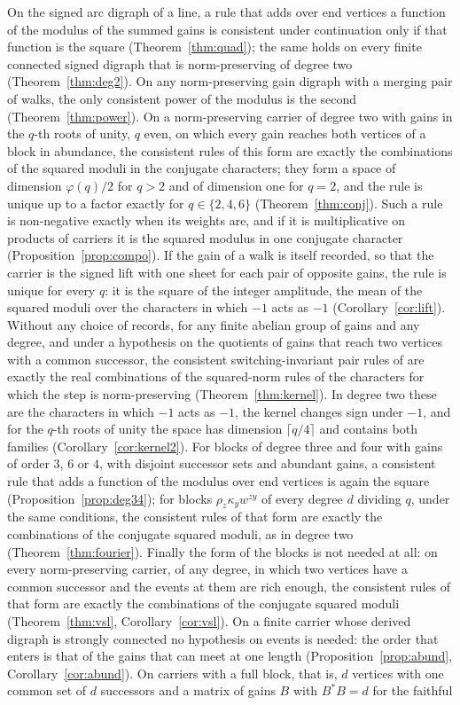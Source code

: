 \item On the signed arc digraph of a line, a rule that adds over end vertices a function of the modulus of the summed gains is consistent under continuation only if that function is the square (Theorem~\ref{thm:quad}); the same holds on every finite connected signed digraph that is norm-preserving of degree two (Theorem~\ref{thm:deg2}). On any norm-preserving gain digraph with a merging pair of walks, the only consistent power of the modulus is the second (Theorem~\ref{thm:power}). On a norm-preserving carrier of degree two with gains in the $q$-th roots of unity, $q$ even, on which every gain reaches both vertices of a block in abundance, the consistent rules of this form are exactly the combinations of the squared moduli in the conjugate characters; they form a space of dimension $\varphi(q)/2$ for $q>2$ and of dimension one for $q=2$, and the rule is unique up to a factor exactly for $q\in\{2,4,6\}$ (Theorem~\ref{thm:conj}). Such a rule is non-negative exactly when its weights are, and if it is multiplicative on products of carriers it is the squared modulus in one conjugate character (Proposition~\ref{prop:compo}). If the gain of a walk is itself recorded, so that the carrier is the signed lift with one sheet for each pair of opposite gains, the rule is unique for every $q$: it is the square of the integer amplitude, the mean of the squared moduli over the characters in which $-1$ acts as $-1$ (Corollary~\ref{cor:lift}). Without any choice of records, for any finite abelian group of gains and any degree, and under a hypothesis on the quotients of gains that reach two vertices with a common successor, the consistent switching-invariant pair rules of \cite{g8} are exactly the real combinations of the squared-norm rules of the characters for which the step is norm-preserving (Theorem~\ref{thm:kernel}). In degree two these are the characters in which $-1$ acts as $-1$, the kernel changes sign under $-1$, and for the $q$-th roots of unity the space has dimension $\lceil q/4\rceil$ and contains both families (Corollary~\ref{cor:kernel2}). For blocks of degree three and four with gains of order $3$, $6$ or $4$, with disjoint successor sets and abundant gains, a consistent rule that adds a function of the modulus over end vertices is again the square (Proposition~\ref{prop:deg34}); for blocks $\rho_z\kappa_yw^{zy}$ of every degree $d$ dividing $q$, under the same conditions, the consistent rules of that form are exactly the combinations of the conjugate squared moduli, as in degree two (Theorem~\ref{thm:fourier}). Finally the form of the blocks is not needed at all: on every norm-preserving carrier, of any degree, in which two vertices have a common successor and the events at them are rich enough, the consistent rules of that form are exactly the combinations of the conjugate squared moduli (Theorem~\ref{thm:vsl}, Corollary~\ref{cor:vsl}). On a finite carrier whose derived digraph is strongly connected no hypothesis on events is needed: the order that enters is that of the gains that can meet at one length (Proposition~\ref{prop:abund}, Corollary~\ref{cor:abund}). On carriers with a full block, that is, $d$ vertices with one common set of $d$ successors and a matrix of gains $B$ with $B^*B=d$ for the faithful 